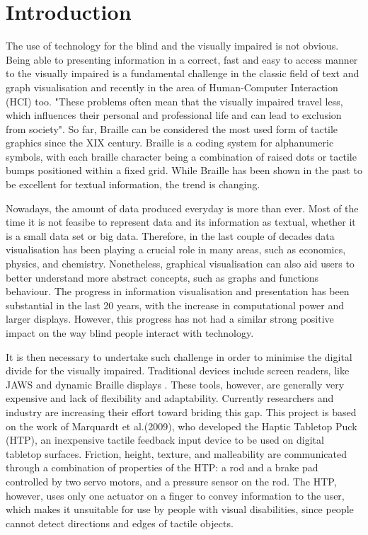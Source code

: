\chapter{Introduction}
\par
The use of technology for the blind and the visually impaired is not obvious. Being able to presenting information in a correct, fast and easy to access manner to the visually impaired is a fundamental challenge in the classic field of text and graph visualisation and recently in the area of Human-Computer Interaction (HCI) too. "These problems often mean that the visually impaired travel less, which influences their personal and professional life and can lead to exclusion from society"\cite{brock2010usage}.
\newline
So far, Braille can be considered the most used form of tactile graphics since the XIX century. Braille is a coding system for alphanumeric symbols, with each braille character being a combination of raised dots or tactile bumps positioned within a fixed grid. While Braille has been shown in the past to be excellent for textual information, the trend is changing. \par

Nowadays, the amount of data produced everyday is more than ever. Most of the time it is not feasibe to represent data and its information as textual, whether it is a small data set or big data. Therefore, in the last couple of decades data visualisation has been playing a crucial role in many areas, such as economics, physics, and chemistry. Nonetheless, graphical visualisation can also aid users to better understand more abstract concepts, such as graphs and functions behaviour. 
The progress in information visualisation and presentation has been substantial in the last 20 years, with the increase in computational power and larger displays. However, this progress has not had a similar strong positive impact on the way blind people interact with technology.
\par 

It is then necessary to undertake such challenge in order to minimise the digital divide for the visually impaired. Traditional devices include screen readers, like JAWS and dynamic Braille displays . These tools, however, are generally very expensive and lack of flexibility and adaptability. Currently researchers and industry are increasing their effort toward briding this gap. This project is based on the work of Marquardt et al.(2009)\nocite{marquardt2009haptic}, who developed the Haptic Tabletop Puck (HTP), an inexpensive tactile feedback input device to be used on digital tabletop surfaces. Friction, height, texture, and malleability are communicated through a combination of properties of the HTP: a rod and a brake pad controlled by two servo motors, and a pressure sensor on the rod. The HTP, however, uses only one actuator on a finger to convey information to the user, which makes it unsuitable for use by people with visual disabilities, since people cannot detect directions and edges of tactile objects. \par


